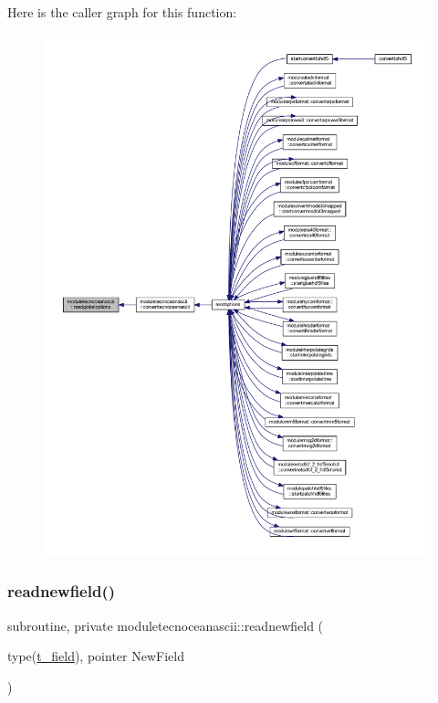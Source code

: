 Here is the caller graph for this function\+:\nopagebreak
\begin{figure}[H]
\begin{center}
\leavevmode
\includegraphics[width=350pt]{namespacemoduletecnoceanascii_a03b597bccde1ea1f6661a59bd7599167_icgraph}
\end{center}
\end{figure}
\mbox{\label{namespacemoduletecnoceanascii_a3a6fefcdee1dbb139d00be33aaf2e48f}} 
\subsubsection{\texorpdfstring{readnewfield()}{readnewfield()}}
{\footnotesize\ttfamily subroutine, private moduletecnoceanascii\+::readnewfield (\begin{DoxyParamCaption}\item[{type(\mbox{\hyperlink{structmoduletecnoceanascii_1_1t__field}{t\+\_\+field}}), pointer}]{New\+Field }\end{DoxyParamCaption})\hspace{0.3cm}{\ttfamily [private]}}

